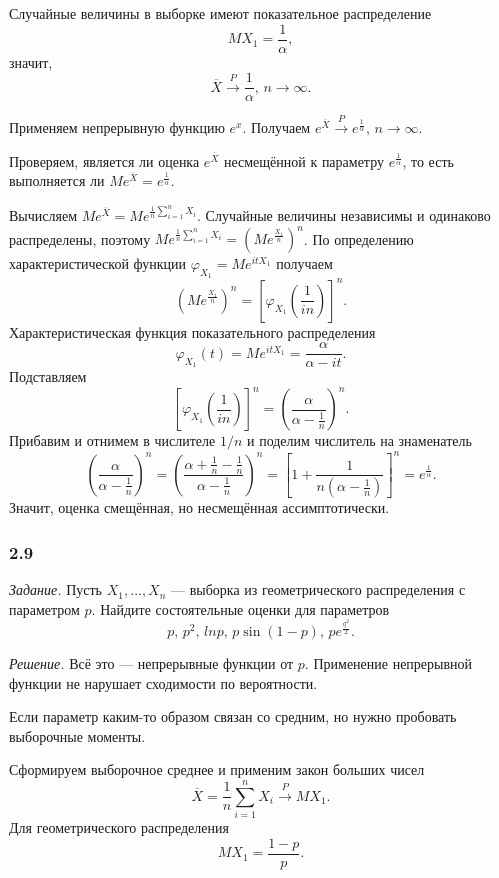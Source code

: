 Случайные величины в выборке имеют показательное распределение
$$MX_1 =
  \frac{1}{ \alpha },$$
значит,
$$ \overline{X} \overset{P}{ \to } \frac{1}{ \alpha }, \,
  n \to \infty.$$

Применяем непрерывную функцию $e^x$.
Получаем $e^{ \overline{X}} \overset{P}{ \to } e^{ \frac{1}{ \alpha }}, \, n \to \infty $.

Проверяем, является ли оценка $e^{ \overline{X}}$ несмещённой к параметру $e^{ \frac{1}{ \alpha }}$,
то есть выполняется ли $Me^{ \overline{X}} = e^{ \frac{1}{ \alpha }}$.

Вычисляем $Me^{ \overline{X}} = Me^{ \frac{1}{n} \sum \limits_{i = 1}^n X_i}$.
Случайные величины независимы и одинаково распределены,
поэтому $Me^{ \frac{1}{n} \sum \limits_{i = 1}^n X_i} = \left( Me^{ \frac{X_1}{n}} \right)^n$.
По определению характеристической функции $ \varphi_{X_1} = Me^{itX_1}$ получаем
$$ \left( Me^{ \frac{X_1}{n}} \right)^n =
  \left[ \varphi_{X_1} \left( \frac{1}{in} \right) \right]^n.$$
Характеристическая функция показательного распределения
$$ \varphi_{X_1} \left(t \right) =
  Me^{itX_1} =
  \frac{ \alpha }{ \alpha - it}.$$
Подставляем
$$ \left[ \varphi_{X_1} \left( \frac{1}{in} \right) \right]^n =
  \left( \frac{ \alpha }{ \alpha - \frac{1}{n}} \right)^n.$$
Прибавим и отнимем в числителе $1 / n$ и поделим числитель на знаменатель
$$ \left( \frac{ \alpha }{ \alpha - \frac{1}{n}} \right)^n =
  \left( \frac{ \alpha + \frac{1}{n} - \frac{1}{n}}{ \alpha - \frac{1}{n}} \right)^n =
  \left[ 1 + \frac{1}{n \left( \alpha - \frac{1}{n} \right)} \right]^n =
  e^{ \frac{1}{ \alpha }}.$$
Значит, оценка смещённая, но несмещённая ассимптотически.

\subsubsection*{2.9}

\textit{Задание.}
Пусть $X_1, \dotsc, X_n$ --- выборка из геометрического распределения с параметром $p$.
Найдите состоятельные оценки для параметров
$$p, \,
  p^2, \,
  ln p, \,
  p \sin \left( 1 - p \right), \,
  pe^{ \frac{q^2}{2}}.$$

\textit{Решение.} Всё это --- непрерывные функции от $p$.
Применение непрерывной функции не нарушает сходимости по вероятности.

Если параметр каким-то образом связан со средним, но нужно пробовать выборочные моменты.

Сформируем выборочное среднее и применим закон больших чисел
$$ \overline{X} =
  \frac{1}{n} \sum \limits_{i = 1}^n X_i \overset{P}{ \to }
  MX_1.$$
Для геометрического распределения
$$MX_1 =
  \frac{1 - p}{p}.$$

